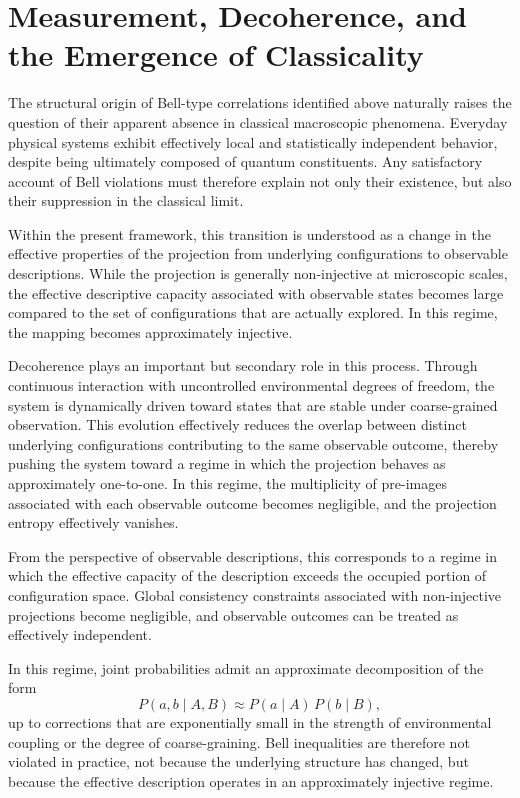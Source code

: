 \section{Measurement, Decoherence, and the Emergence of Classicality}
  \label{sec:classical-limit}

  The structural origin of Bell-type correlations identified above naturally raises
  the question of their apparent absence in classical macroscopic phenomena.
  Everyday physical systems exhibit effectively local and statistically independent
  behavior, despite being ultimately composed of quantum constituents.
  Any satisfactory account of Bell violations must therefore explain not only their
  existence, but also their suppression in the classical limit.

  Within the present framework, this transition is understood as a change in the
  effective properties of the projection from underlying configurations to observable
  descriptions.
  While the projection is generally non-injective at microscopic scales, the effective
  descriptive capacity associated with observable states becomes large compared to the
  set of configurations that are actually explored.
  In this regime, the mapping becomes approximately injective.

  Decoherence plays an important but secondary role in this process.
  Through continuous interaction with uncontrolled environmental degrees of freedom,
  the system is dynamically driven toward states that are stable under coarse-grained
  observation.
  This evolution effectively reduces the overlap between distinct underlying
  configurations contributing to the same observable outcome, thereby pushing the
  system toward a regime in which the projection behaves as approximately one-to-one.
  In this regime, the multiplicity of pre-images associated with each observable outcome
  becomes negligible, and the projection entropy effectively vanishes.

  From the perspective of observable descriptions, this corresponds to a regime in
  which the effective capacity of the description exceeds the occupied portion of
  configuration space.
  Global consistency constraints associated with non-injective projections become
  negligible, and observable outcomes can be treated as effectively independent.

  In this regime, joint probabilities admit an approximate decomposition of the form
  \begin{equation}
    P(a,b \mid A,B) \approx P(a \mid A)\,P(b \mid B),
  \end{equation}
  up to corrections that are exponentially small in the strength of environmental
  coupling or the degree of coarse-graining.
  Bell inequalities are therefore not violated in practice, not because the underlying
  structure has changed, but because the effective description operates in an
  approximately injective regime.

